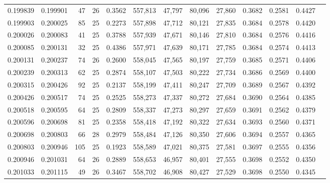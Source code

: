 \begin{tabular}{rrrrrrrrrrrrr}
0.199839 & 0.199901 &    47 &  26 &                                     0.3562 & 557,813 &  47,797 &  80,096 &  27,860 & 0.3682 & 0.2581 & 0.4427 \\
0.199903 & 0.200025 &    85 &  25 &                                     0.2273 & 557,898 &  47,712 &  80,121 &  27,835 & 0.3684 & 0.2578 & 0.4420 \\
0.200026 & 0.200083 &    41 &  25 &                                     0.3788 & 557,939 &  47,671 &  80,146 &  27,810 & 0.3684 & 0.2576 & 0.4416 \\
0.200085 & 0.200131 &    32 &  25 &                                     0.4386 & 557,971 &  47,639 &  80,171 &  27,785 & 0.3684 & 0.2574 & 0.4413 \\
0.200131 & 0.200237 &    74 &  26 &                                     0.2600 & 558,045 &  47,565 &  80,197 &  27,759 & 0.3685 & 0.2571 & 0.4406 \\
0.200239 & 0.200313 &    62 &  25 &                                     0.2874 & 558,107 &  47,503 &  80,222 &  27,734 & 0.3686 & 0.2569 & 0.4400 \\
0.200315 & 0.200426 &    92 &  25 &                                     0.2137 & 558,199 &  47,411 &  80,247 &  27,709 & 0.3689 & 0.2567 & 0.4392 \\
0.200426 & 0.200517 &    74 &  25 &                                     0.2525 & 558,273 &  47,337 &  80,272 &  27,684 & 0.3690 & 0.2564 & 0.4385 \\
0.200518 & 0.200595 &    64 &  25 &                                     0.2809 & 558,337 &  47,273 &  80,297 &  27,659 & 0.3691 & 0.2562 & 0.4379 \\
0.200596 & 0.200698 &    81 &  25 &                                     0.2358 & 558,418 &  47,192 &  80,322 &  27,634 & 0.3693 & 0.2560 & 0.4371 \\
0.200698 & 0.200803 &    66 &  28 &                                     0.2979 & 558,484 &  47,126 &  80,350 &  27,606 & 0.3694 & 0.2557 & 0.4365 \\
0.200803 & 0.200946 &   105 &  25 &                                     0.1923 & 558,589 &  47,021 &  80,375 &  27,581 & 0.3697 & 0.2555 & 0.4356 \\
0.200946 & 0.201031 &    64 &  26 &                                     0.2889 & 558,653 &  46,957 &  80,401 &  27,555 & 0.3698 & 0.2552 & 0.4350 \\
0.201033 & 0.201115 &    49 &  26 &                                     0.3467 & 558,702 &  46,908 &  80,427 &  27,529 & 0.3698 & 0.2550 & 0.4345 \\

\end{tabular}
